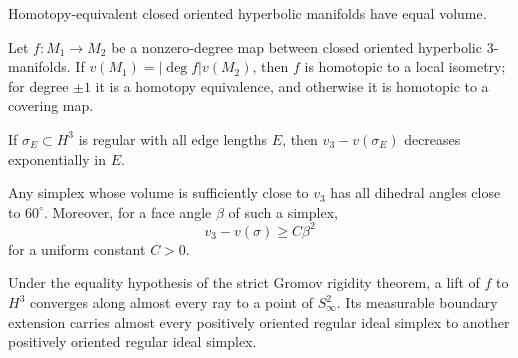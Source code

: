 \begin{lemma}
\label{thurston-ch06-mostow-volume-rigidity}

Homotopy-equivalent closed oriented hyperbolic manifolds have equal volume.
\end{lemma}

\begin{theorem}
\label{thurston-ch06-strict-gromov-rigidity}

Let $f:M_1\to M_2$ be a nonzero-degree map between closed oriented hyperbolic $3$-manifolds. If $v(M_1)=|\deg f|v(M_2)$, then $f$ is homotopic to a local isometry; for degree $\pm1$ it is a homotopy equivalence, and otherwise it is homotopic to a covering map.
\end{theorem}

\begin{theorem}
\label{thurston-ch06-regular-simplex-convergence}

If $\sigma_E\subset H^3$ is regular with all edge lengths $E$, then $v_3-v(\sigma_E)$ decreases exponentially in $E$.
\end{theorem}

\begin{lemma}
\label{thurston-ch06-near-maximal-angles}

Any simplex whose volume is sufficiently close to $v_3$ has all dihedral angles close to $60^\circ$. Moreover, for a face angle $\beta$ of such a simplex,
\[
v_3-v(\sigma)\geq C\beta^2
\]
for a uniform constant $C>0$.
\end{lemma}

\begin{lemma}
\label{thurston-ch06-measurable-boundary-extension}

Under the equality hypothesis of the strict Gromov rigidity theorem, a lift of $f$ to $H^3$ converges along almost every ray to a point of $S^2_\infty$. Its measurable boundary extension carries almost every positively oriented regular ideal simplex to another positively oriented regular ideal simplex.
\end{lemma}

